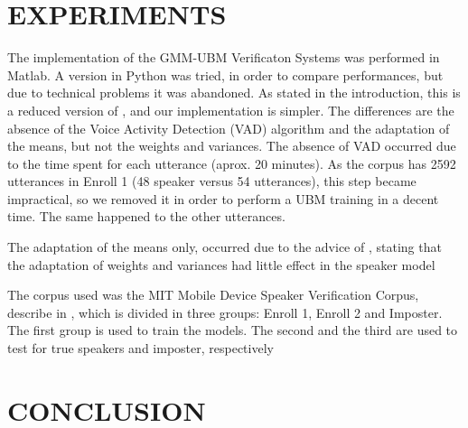 \documentclass[a4paper,twocolumn]{article}
\begin{document}
\section{EXPERIMENTS}

The implementation of the GMM-UBM Verificaton Systems was performed in Matlab. A version in Python was tried, in order to compare performances, but due to technical problems it was abandoned. As stated in the introduction, this is a reduced version of \cite{reynolds_et_al_2000}, and our implementation is simpler. The differences are the absence of the Voice Activity Detection (VAD) algorithm and the adaptation of the means, but not the weights and variances. The absence of VAD occurred due to the time spent for each utterance (aprox. 20 minutes). As the corpus has 2592  utterances in Enroll 1 (48 speaker versus 54 utterances), this step became impractical, so we removed it in order to perform a UBM training in a decent time. The same happened to the other utterances.

The adaptation of the means only, occurred due to the advice of \cite{reynolds_et_al_2000}, stating that the adaptation of weights and variances had little effect in the speaker model

The corpus used was the MIT Mobile Device Speaker Verification Corpus, describe in \cite{corpus_paper}, which is divided in three groups: Enroll 1, Enroll 2 and Imposter. The first group is used to train the models. The second and the third are used to test for true speakers and imposter, respectively


\section{CONCLUSION}
\end{document}
